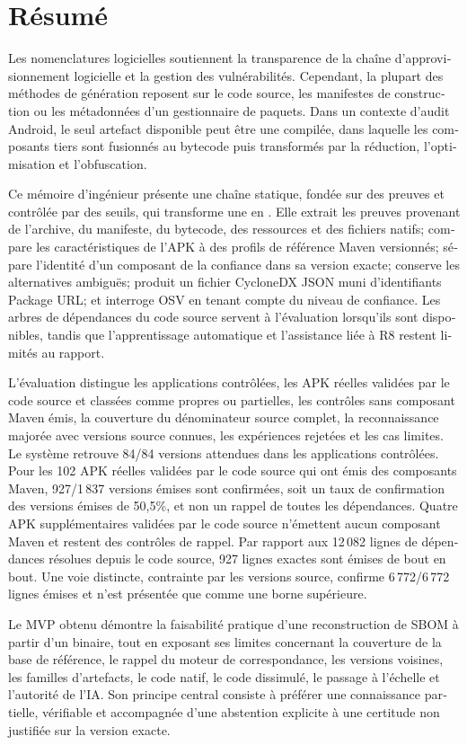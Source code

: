 \chapter*{Résumé}

\begin{otherlanguage}{french}
Les nomenclatures logicielles soutiennent la transparence de la chaîne
d'approvisionnement logicielle et la gestion des vulnérabilités. Cependant,
la plupart des méthodes de génération reposent sur le code source, les
manifestes de construction ou les métadonnées d'un gestionnaire de paquets.
Dans un contexte d'audit Android, le seul artefact disponible peut être une
\APK compilée, dans laquelle les composants tiers sont fusionnés au bytecode
\DEX puis transformés par la réduction, l'optimisation et l'obfuscation.

Ce mémoire d'ingénieur présente une chaîne statique, fondée sur des preuves et
contrôlée par des seuils, qui transforme une \APK en \SBOM. Elle extrait les
preuves provenant de l'archive, du manifeste, du bytecode, des ressources et
des fichiers natifs; compare les caractéristiques de l'APK à des profils de
référence Maven versionnés; sépare l'identité d'un composant de la confiance
dans sa version exacte; conserve les alternatives ambiguës; produit un fichier
CycloneDX JSON muni d'identifiants Package URL; et interroge OSV en tenant
compte du niveau de confiance. Les arbres de dépendances du code source servent
à l'évaluation lorsqu'ils sont disponibles, tandis que l'apprentissage
automatique et l'assistance liée à R8 restent limités au rapport.

L'évaluation distingue les applications contrôlées, les APK réelles validées
par le code source et classées comme propres ou partielles, les contrôles sans
composant Maven émis, la couverture du dénominateur source complet, la
reconnaissance majorée avec versions source connues, les expériences rejetées
et les cas limites. Le système retrouve 84/84 versions attendues dans les
applications contrôlées. Pour les 102 APK réelles validées par le code source
qui ont émis des composants Maven, 927/1\,837 versions émises sont confirmées,
soit un taux de confirmation des versions émises de 50,5\%, et non un rappel
de toutes les dépendances. Quatre APK supplémentaires validées par le code
source n'émettent aucun composant Maven et restent des contrôles de rappel.
Par rapport aux 12\,082 lignes de dépendances résolues depuis le code source,
927 lignes exactes sont émises de bout en bout. Une voie distincte, contrainte
par les versions source, confirme 6\,772/6\,772 lignes émises et n'est
présentée que comme une borne supérieure.

Le MVP obtenu démontre la faisabilité pratique d'une reconstruction de SBOM à
partir d'un binaire, tout en exposant ses limites concernant la couverture de
la base de référence, le rappel du moteur de correspondance, les versions
voisines, les familles d'artefacts, le code natif, le code dissimulé, le
passage à l'échelle et l'autorité de l'IA. Son principe central consiste à
préférer une connaissance partielle, vérifiable et accompagnée d'une
abstention explicite à une certitude non justifiée sur la version exacte.
\end{otherlanguage}

